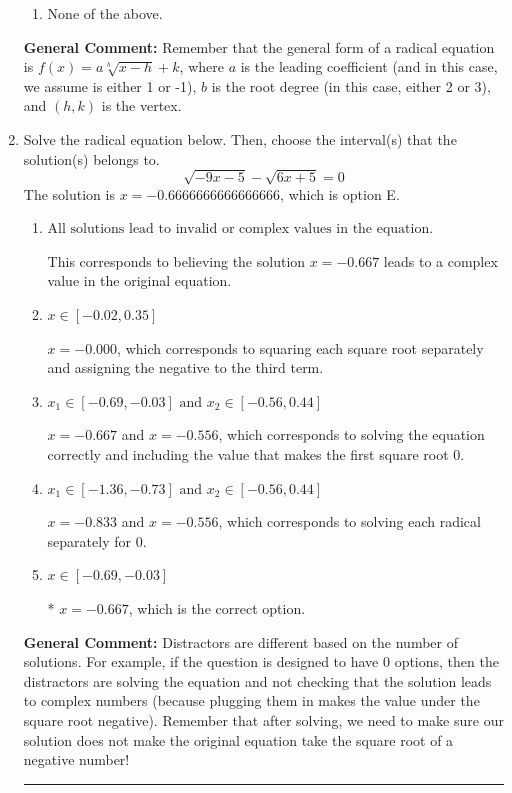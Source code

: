 \documentclass{extbook}[14pt]
\newcommand{\litem}[1]{\item #1

\rule{\textwidth}{0.4pt}}
\begin{document}
\begin{enumerate}
{\begin{enumerate}[label=\Alph*.]
\begin{multicols}{2}
\end{multicols}\item None of the above.\end{enumerate}
\textbf{General Comment:} Remember that the general form of a radical equation is $ f(x) = a \sqrt[b]{x - h} + k $, where $a$ is the leading coefficient (and in this case, we assume is either 1 or -1), $b$ is the root degree (in this case, either 2 or 3), and $(h, k)$ is the vertex.
}
\litem{
Solve the radical equation below. Then, choose the interval(s) that the solution(s) belongs to.
\[ \sqrt{-9 x - 5} - \sqrt{6 x + 5} = 0 \]
The solution is \( x = -0.6666666666666666 \), which is option E.\begin{enumerate}[label=\Alph*.]
\item \( \text{All solutions lead to invalid or complex values in the equation.} \)

This corresponds to believing the solution $x = -0.667$ leads to a complex value in the original equation.
\item \( x \in [-0.02,0.35] \)

$x = -0.000$, which corresponds to squaring each square root separately and assigning the negative to the third term.
\item \( x_1 \in [-0.69, -0.03] \text{ and } x_2 \in [-0.56,0.44] \)

$x = -0.667$ and $x = -0.556$, which corresponds to solving the equation correctly and including the value that makes the first square root 0.
\item \( x_1 \in [-1.36, -0.73] \text{ and } x_2 \in [-0.56,0.44] \)

$x = -0.833$ and $x = -0.556$, which corresponds to solving each radical separately for 0.
\item \( x \in [-0.69,-0.03] \)

* $x = -0.667$, which is the correct option.
\end{enumerate}

\textbf{General Comment:} Distractors are different based on the number of solutions. For example, if the question is designed to have 0 options, then the distractors are solving the equation and not checking that the solution leads to complex numbers (because plugging them in makes the value under the square root negative). Remember that after solving, we need to make sure our solution does not make the original equation take the square root of a negative number!
}
\end{enumerate}
\end{document}
